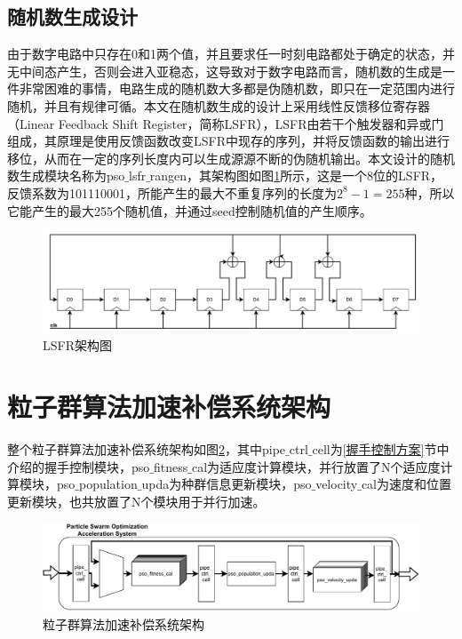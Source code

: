 \subsection{随机数生成设计}
由于数字电路中只存在0和1两个值，并且要求任一时刻电路都处于确定的状态，并无中间态产生，否则会进入亚稳态，这导致对于数字电路而言，随机数的生成是一件非常困难的事情，电路生成的随机数大多都是伪随机数，即只在一定范围内进行随机，并且有规律可循。本文在随机数生成的设计上采用线性反馈移位寄存器（Linear Feedback Shift Register，简称LSFR），LSFR由若干个触发器和异或门组成，其原理是使用反馈函数改变LSFR中现存的序列，并将反馈函数的输出进行移位，从而在一定的序列长度内可以生成源源不断的伪随机输出。本文设计的随机数生成模块名称为pso$\_$lsfr$\_$rangen，其架构图如图\ref{fig:LSFR架构图}所示，这是一个8位的LSFR，反馈系数为101110001，所能产生的最大不重复序列的长度为$2^8-1=255$种，所以它能产生的最大255个随机值，并通过seed控制随机值的产生顺序。
\begin{figure}[htb]
    \centering
    \includegraphics[width=14cm]{fig/5-fig/LSFR架构图.pdf}
    \caption{LSFR架构图}
    \label{fig:LSFR架构图}
\end{figure}

\section{粒子群算法加速补偿系统架构}
整个粒子群算法加速补偿系统架构如图\ref{fig:粒子群算法加速补偿系统架构示意图}，其中pipe$\_$ctrl$\_$cell为\ref{握手控制方案}节中介绍的握手控制模块，pso$\_$fitness$\_$cal为适应度计算模块，并行放置了N个适应度计算模块，pso$\_$population$\_$upda为种群信息更新模块，pso$\_$velocity$\_$cal为速度和位置更新模块，也共放置了N个模块用于并行加速。

\begin{figure}[htb]
    \centering
    \includegraphics[width=14cm]{fig/5-fig/粒子群算法加速系统架构.drawio.pdf}
    \caption{粒子群算法加速补偿系统架构}
    \label{fig:粒子群算法加速补偿系统架构示意图}
\end{figure}

